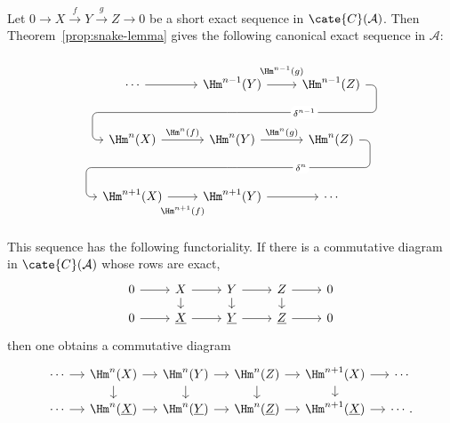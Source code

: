 \begin{proposition}\label{prop:long-exact-sequence-ses}
	Let $0\to X\xrightarrow{f}Y\xrightarrow{g}Z\to0$ be a short exact
	sequence in $\cate{C}(\mathcal{A})$. Then Theorem~\ref{prop:snake-lemma}
	gives the following canonical exact sequence in $\mathcal{A}$:

	\begin{equation*}\begin{tikzcd}[row sep=large]
	\cdots \arrow[r] & \Hm^{n-1}(Y) \arrow[r, "{\Hm^{n-1}(g)}" inner sep=0.7em] \arrow[phantom, d, ""{coordinate, name=A}] & \Hm^{n-1}(Z) \arrow[dll, rounded corners, "{\delta^{n-1}}" description, to path={
		-- ([xshift=2ex]\tikztostart.east)
		|- (A) [near end]\tikztonodes
		-| ([xshift=-2ex]\tikztotarget.west)
		-- (\tikztotarget)}] \\
	\Hm^n(X) \arrow[r, "{\Hm^n(f)}"] & \Hm^n(Y) \arrow[r, "{\Hm^n(g)}"] \arrow[phantom, d, ""{coordinate, name=B}] & \Hm^n(Z) \arrow[dll, rounded corners, "{\delta^n}" description, to path={
		-- ([xshift=2ex]\tikztostart.east)
		|- (B) [near end]\tikztonodes
		-| ([xshift=-2ex]\tikztotarget.west)
		-- (\tikztotarget)}] \\
	\Hm^{n+1}(X) \arrow[r, "{\Hm^{n+1}(f)}"' inner sep=0.7em] & \Hm^{n+1}(Y) \arrow[r] & \cdots
	\end{tikzcd}\end{equation*}

	This sequence has the following functoriality. If there is a commutative
	diagram in $\cate{C}(\mathcal{A})$ whose rows are exact,
	\[\begin{tikzcd}[row sep=small]
		0 \arrow[r] & X \arrow[r] \arrow[d] & Y \arrow[r] \arrow[d] & Z \arrow[d] \arrow[r] & 0 \\
		0 \arrow[r] & \underline{X} \arrow[r] & \underline{Y} \arrow[r] & \underline{Z} \arrow[r] & 0
	\end{tikzcd}\]
	then one obtains a commutative diagram
	\[\begin{tikzcd}[column sep=small, row sep=small]
		\cdots \arrow[r] & \Hm^n(X) \arrow[d] \arrow[r] & \Hm^n(Y) \arrow[r] \arrow[d] & \Hm^n(Z) \arrow[r] \arrow[d] & \Hm^{n+1}(X) \arrow[r] \arrow[d] & \cdots \\
		\cdots \arrow[r] & \Hm^n(\underline{X}) \arrow[r] & \Hm^n(\underline{Y}) \arrow[r] & \Hm^n(\underline{Z}) \arrow[r] & \Hm^{n+1}(\underline{X}) \arrow[r] & \cdots .
	\end{tikzcd}\]
\end{proposition}

